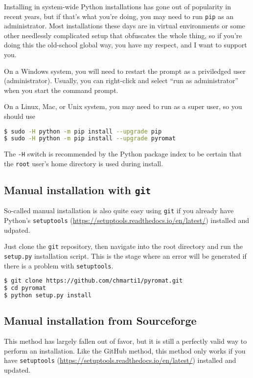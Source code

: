 Installing in system-wide Python installations has gone out of popularity in recent years, but if that's what you're doing, you may need to run \texttt{pip} as an administrator.  Most installations these days are in virtual environments or some other needlessly complicated setup that obfuscates the whole thing, so if you're doing this the old-school global way, you have my respect, and I want to support you.

On a Windows system, you will need to restart the prompt as a priviledged user (administrator).  Usually, you can right-click and select ``run as administrator'' when you start the command prompt.

On a Linux, Mac, or Unix system, you may need to run as a super user, so you should use
\begin{lstlisting}[language=bash]
$ sudo -H python -m pip install --upgrade pip
$ sudo -H python -m pip install --upgrade pyromat
\end{lstlisting}
The \texttt{-H} switch is recommended by the Python package index to be certain that the \texttt{root} user's home directory is used during install.

\subsection{Manual installation with \texttt{git}}

So-called manual installation is also quite easy using \texttt{git} if you already have Python's \texttt{setuptools} (\url{https://setuptools.readthedocs.io/en/latest/}) installed and udpated.

Just clone the \texttt{git} repository, then navigate into the root directory and run the \texttt{setup.py} installation script.  This is the stage where an error will be generated if there is a problem with \texttt{setuptools}.

\begin{lstlisting}[language=bash]
$ git clone https://github.com/chmarti1/pyromat.git
$ cd pyromat
$ python setup.py install
\end{lstlisting}

\subsection{Manual installation from Sourceforge}

This method has largely fallen out of favor, but it is still a perfectly valid way to perform an installation.  Like the GitHub method, this method only works if you have \texttt{setuptools} (\url{https://setuptools.readthedocs.io/en/latest/}) installed and updated.

